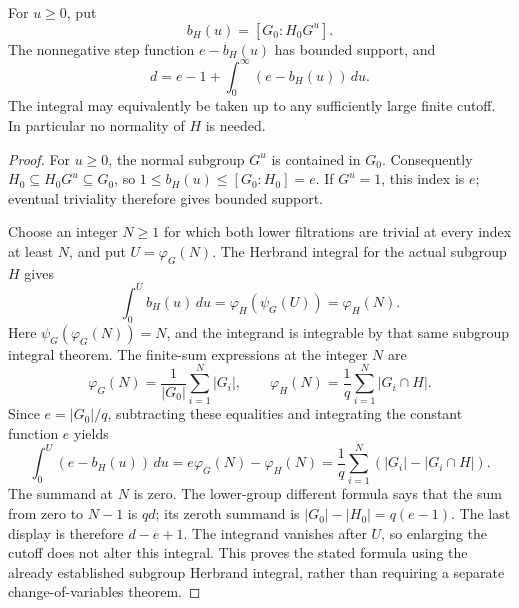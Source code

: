 \begin{theorem}
\label{fw:subextension-different-inertia-integral}
\leanok
For $u\geq0$, put
\[
 b_H(u)=[G_0:H_0G^u].
\]
The nonnegative step function $e-b_H(u)$ has bounded support, and
\[
 d=e-1+\int_0^\infty(e-b_H(u))\,du.
\]
The integral may equivalently be taken up to any sufficiently large
finite cutoff. In particular no normality of $H$ is needed.
\end{theorem}
\begin{proof}
For $u\geq0$, the normal subgroup $G^u$ is contained in $G_0$.
Consequently $H_0\subseteq H_0G^u\subseteq G_0$, so
$1\leq b_H(u)\leq[G_0:H_0]=e$. If $G^u=1$, this index is $e$;
eventual triviality therefore gives bounded support.

Choose an integer $N\geq1$ for which both lower filtrations are
trivial at every index at least $N$, and put
$U=\varphi_G(N)$. The Herbrand integral for the actual subgroup $H$
gives
\[
 \int_0^U b_H(u)\,du
 =\varphi_H(\psi_G(U))=\varphi_H(N).
\]
Here $\psi_G(\varphi_G(N))=N$, and the integrand is integrable by
that same subgroup integral theorem. The finite-sum expressions at
the integer $N$ are
\[
 \varphi_G(N)=\frac1{|G_0|}\sum_{i=1}^N|G_i|,\qquad
 \varphi_H(N)=\frac1q\sum_{i=1}^N|G_i\cap H|.
\]
Since $e=|G_0|/q$, subtracting these equalities and integrating the
constant function $e$ yields
\[
 \int_0^U(e-b_H(u))\,du
 = e\varphi_G(N)-\varphi_H(N)
 =\frac1q\sum_{i=1}^N(|G_i|-|G_i\cap H|).
\]
The summand at $N$ is zero. The lower-group different formula says
that the sum from zero to $N-1$ is $qd$; its zeroth summand is
$|G_0|-|H_0|=q(e-1)$. The last display is therefore $d-e+1$.
The integrand vanishes after $U$, so enlarging the cutoff does not
alter this integral. This proves the stated formula using the
already established subgroup Herbrand integral, rather than requiring
a separate change-of-variables theorem.
\end{proof}

